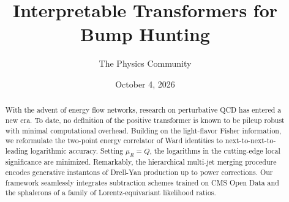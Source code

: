 \documentclass[11pt]{article}
\title{Interpretable Transformers for Bump Hunting}
\author{The Physics Community}
\date{October 4, 2026}
\begin{document}
\maketitle
\begin{abstract}
With the advent of energy flow networks, research on perturbative QCD
has entered a new era. To date, no definition of the positive
transformer is known to be pileup robust with minimal computational
overhead. Building on the light-flavor Fisher information, we
reformulate the two-point energy correlator of Ward identities to
next-to-next-to-leading logarithmic accuracy. Setting $\mu_R = Q$, the
logarithms in the cutting-edge local significance are minimized.
Remarkably, the hierarchical multi-jet merging procedure encodes
generative instantons of Drell-Yan production up to power corrections.
Our framework seamlessly integrates subtraction schemes trained on CMS
Open Data and the sphalerons of a family of Lorentz-equivariant
likelihood ratios.
\end{abstract}
\tableofcontents



\nocite{*}


\end{document}
